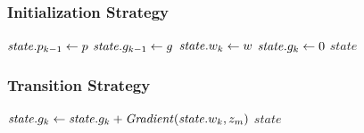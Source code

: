 \subsubsection{Initialization Strategy}
\begin{algorithm}[initialization-cg$(w)$] \label{alg:initialization-cg}
\begin{algorithmic}[1]
    \State $\mathit{state}.p_{k-1} \leftarrow p$
    \State $\mathit{state}.g_{k-1} \leftarrow g$
    \State $\mathit{state}.w_k \leftarrow w$
    \State $\mathit{state}.g_k \leftarrow 0$
    \State \Return $\mathit{state}$
\end{algorithmic}
\end{algorithm}

\subsubsection{Transition Strategy}
\begin{algorithm} \label{alg:transition-cg}
\begin{algorithmic}[1]
    \State $\mathit{state}.g_k \leftarrow \mathit{state}.g_k + \mathit{Gradient}(\mathit{state}.w_k, z_m)$
    \State \Return $\mathit{state}$
\end{algorithmic}
\end{algorithm}


